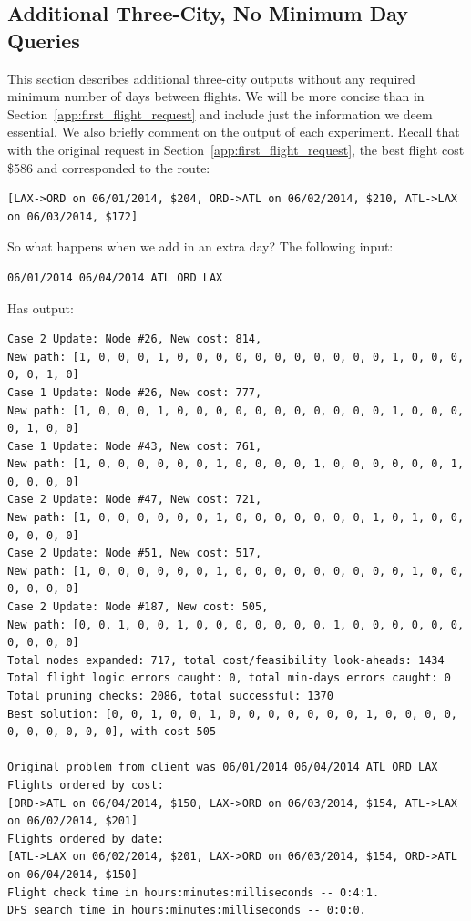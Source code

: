 \documentclass{article}
\begin{document}
\subsection{Additional Three-City, No Minimum Day Queries}

This section describes additional three-city outputs without any required minimum number of days between flights. We will be more concise than in
Section~\ref{app:first_flight_request} and include just the information we deem essential. We also briefly comment on the output of each experiment.
Recall that with the original request in Section~\ref{app:first_flight_request}, the best flight cost \$586 and corresponded to the route:

\footnotesize
\begin{verbatim}
[LAX->ORD on 06/01/2014, $204, ORD->ATL on 06/02/2014, $210, ATL->LAX on 06/03/2014, $172] 
\end{verbatim}
\normalsize

So what happens when we add in an extra day? The following input:

\begin{verbatim}
06/01/2014 06/04/2014 ATL ORD LAX
\end{verbatim}

Has output:

\scriptsize
\begin{verbatim}
Case 2 Update: Node #26, New cost: 814, 
New path: [1, 0, 0, 0, 1, 0, 0, 0, 0, 0, 0, 0, 0, 0, 0, 0, 1, 0, 0, 0, 0, 0, 1, 0]
Case 1 Update: Node #26, New cost: 777, 
New path: [1, 0, 0, 0, 1, 0, 0, 0, 0, 0, 0, 0, 0, 0, 0, 0, 1, 0, 0, 0, 0, 1, 0, 0]
Case 1 Update: Node #43, New cost: 761, 
New path: [1, 0, 0, 0, 0, 0, 0, 1, 0, 0, 0, 0, 1, 0, 0, 0, 0, 0, 0, 1, 0, 0, 0, 0]
Case 2 Update: Node #47, New cost: 721, 
New path: [1, 0, 0, 0, 0, 0, 0, 1, 0, 0, 0, 0, 0, 0, 0, 1, 0, 1, 0, 0, 0, 0, 0, 0]
Case 2 Update: Node #51, New cost: 517, 
New path: [1, 0, 0, 0, 0, 0, 0, 1, 0, 0, 0, 0, 0, 0, 0, 0, 0, 1, 0, 0, 0, 0, 0, 0]
Case 2 Update: Node #187, New cost: 505, 
New path: [0, 0, 1, 0, 0, 1, 0, 0, 0, 0, 0, 0, 0, 1, 0, 0, 0, 0, 0, 0, 0, 0, 0, 0]
Total nodes expanded: 717, total cost/feasibility look-aheads: 1434
Total flight logic errors caught: 0, total min-days errors caught: 0
Total pruning checks: 2086, total successful: 1370
Best solution: [0, 0, 1, 0, 0, 1, 0, 0, 0, 0, 0, 0, 0, 1, 0, 0, 0, 0, 0, 0, 0, 0, 0, 0], with cost 505

Original problem from client was 06/01/2014 06/04/2014 ATL ORD LAX
Flights ordered by cost:
[ORD->ATL on 06/04/2014, $150, LAX->ORD on 06/03/2014, $154, ATL->LAX on 06/02/2014, $201]
Flights ordered by date:
[ATL->LAX on 06/02/2014, $201, LAX->ORD on 06/03/2014, $154, ORD->ATL on 06/04/2014, $150]
Flight check time in hours:minutes:milliseconds -- 0:4:1.
DFS search time in hours:minutes:milliseconds -- 0:0:0.
\end{verbatim}
\normalsize
\end{document}
